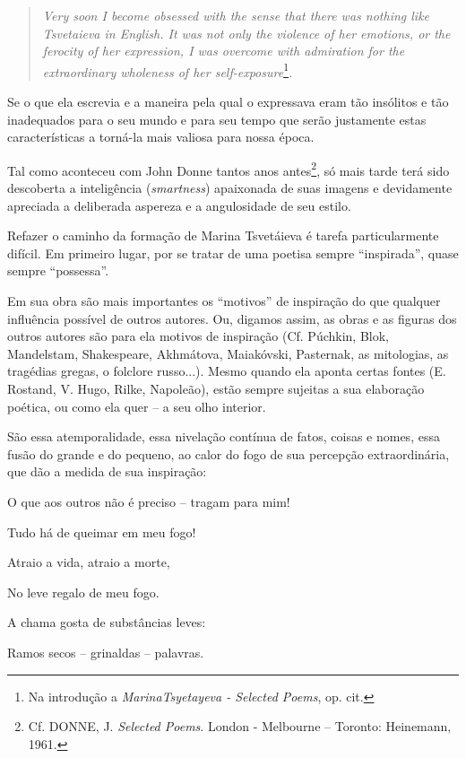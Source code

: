 \begin{quote}
\emph{Very soon I become obsessed with the sense that there was nothing
like Tsvetaieva in English. It was not only the violence of her
emotions, or the ferocity of her expression, I was overcome with
admiration for the extraordinary wholeness of her
self-exposure}\footnote{Na introdução a \emph{MarinaTsyetayeva -
  Selected Poems}, op. cit.}\emph{.}
\end{quote}

Se o que ela escrevia e a maneira pela qual o expressava eram tão
insólitos e tão inadequados para o seu mundo e para seu tempo que serão
justamente estas características a torná-la mais valiosa para nossa
época.

Tal como aconteceu com John Donne tantos anos antes\footnote{Cf. DONNE,
  J. \emph{Selected Poems}. London - Melbourne -- Toronto: Heinemann,
  1961.}, só mais tarde terá sido descoberta a inteligência
(\emph{smartness}) apaixonada de suas imagens e devidamente apreciada a
deliberada aspereza e a angulosidade de seu estilo.

Refazer o caminho da formação de Marina Tsvetáieva é tarefa
particularmente difícil. Em primeiro lugar, por se tratar de uma poetisa
sempre ``inspirada'', quase sempre ``possessa''.

Em sua obra são mais importantes os ``motivos'' de inspiração do que
qualquer influência possível de outros autores. Ou, digamos assim, as
obras e as figuras dos outros autores são para ela motivos de inspiração
(Cf. Púchkin, Blok, Mandelstam, Shakespeare, Akhmátova, Maiakóvski,
Pasternak, as mitologias, as tragédias gregas, o folclore russo...).
Mesmo quando ela aponta certas fontes (E. Rostand, V. Hugo, Rilke,
Napoleão), estão sempre sujeitas a sua elaboração poética, ou como ela
quer -- a seu olho interior.

São essa atemporalidade, essa nivelação contínua de fatos, coisas e
nomes, essa fusão do grande e do pequeno, ao calor do fogo de sua
percepção extraordinária, que dão a medida de sua inspiração:

O que aos outros não é preciso -- tragam para mim!

Tudo há de queimar em meu fogo!

Atraio a vida, atraio a morte,

No leve regalo de meu fogo.

A chama gosta de substâncias leves:

Ramos secos -- grinaldas -- palavras.


